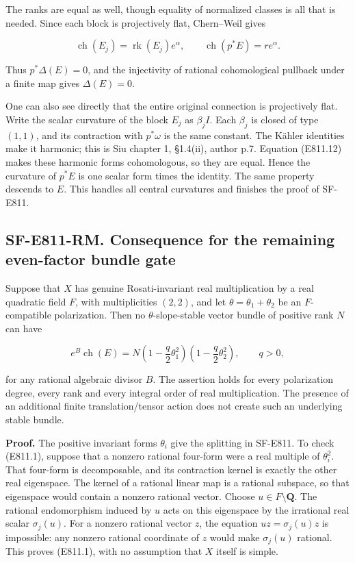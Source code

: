 The ranks are equal as well, though equality of normalized classes is
all that is needed. Since each block is projectively flat, Chern--Weil
gives

\[
 \operatorname{ch}(E_j)=\operatorname{rk}(E_j)e^{\alpha},
 \qquad \operatorname{ch}(p^*E)=r e^{\alpha}.
 \tag{E811.13}
\]

Thus \(p^*\Delta(E)=0\), and the injectivity of rational cohomological
pullback under a finite map gives \(\Delta(E)=0\).

One can also see directly that the entire original connection is
projectively flat. Write the scalar curvature of the block \(E_j\) as
\(\beta_j I\). Each \(\beta_j\) is closed of type \((1,1)\), and its
contraction with \(p^*\omega\) is the same constant. The Kähler
identities make it harmonic; this is Siu chapter 1, §1.4(ii), author
p.7. Equation (E811.12) makes these harmonic forms cohomologous, so they
are equal. Hence the curvature of \(p^*E\) is one scalar form times the
identity. The same property descends to \(E\). This handles all central
curvatures and finishes the proof of SF-E811.

\subsection{SF-E811-RM. Consequence for the remaining even-factor bundle
gate}\label{SF-E811-RM}

Suppose that \(X\) has genuine Rosati-invariant real multiplication by a
real quadratic field \(F\), with multiplicities \((2,2)\), and let
\(\theta=\theta_1+\theta_2\) be an \(F\)-compatible polarization. Then
no \(\theta\)-slope-stable vector bundle of positive rank \(N\) can have

\[
 e^B\operatorname{ch}(E)=N
     \left(1-\frac q2\theta_1^2\right)
     \left(1-\frac q2\theta_2^2\right),\qquad q>0,
 \tag{E811.14}
\]

for any rational algebraic divisor \(B\). The assertion holds for every
polarization degree, every rank and every integral order of real
multiplication. The presence of an additional finite translation/tensor
action does not create such an underlying stable bundle.

\textbf{Proof.} The positive invariant forms \(\theta_i\) give the
splitting in SF-E811. To check (E811.1), suppose that a nonzero rational
four-form were a real multiple of \(\theta_i^2\). That four-form is
decomposable, and its contraction kernel is exactly the other real
eigenspace. The kernel of a rational linear map is a rational subspace,
so that eigenspace would contain a nonzero rational vector. Choose
\(u\in F\setminus\mathbf Q\). The rational endomorphism induced by \(u\)
acts on this eigenspace by the irrational real scalar \(\sigma_j(u)\).
For a nonzero rational vector \(z\), the equation \(uz=\sigma_j(u)z\) is
impossible: any nonzero rational coordinate of \(z\) would make
\(\sigma_j(u)\) rational. This proves (E811.1), with no assumption that
\(X\) itself is simple.

